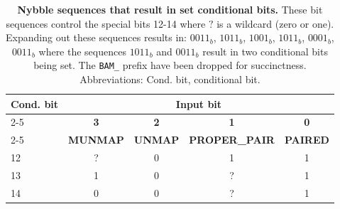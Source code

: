 \begin{table}[]
\centering
\caption{\textbf{Nybble sequences that result in set conditional bits.} These bit sequences control the special bits 12-14 where $?$ is a wildcard (zero or one). Expanding out these sequences results in: $0011_b$, $1011_b$, $1001_b$, $1011_b$, $0001_b$, $0011_b$ where the sequences $1011_b$ and $0011_b$ result in two conditional bits being set. The \texttt{BAM\_} prefix have been dropped for succinctness. Abbreviations: Cond. bit, conditional bit.}
\label{tab:optimize-rules}
\begin{tabular}{|l|c|c|c|c|}
\hline
\multirow{3}{*}{\textbf{Cond. bit}} & \multicolumn{4}{c|}{\textbf{Input bit}}                                    \\ \cline{2-5} 
                                    & \textbf{3}      & \textbf{2}     & \textbf{1}            & \textbf{0}      \\ \cline{2-5} 
                                    & \textbf{MUNMAP} & \textbf{UNMAP} & \textbf{PROPER\_PAIR} & \textbf{PAIRED} \\ \hline
12                                  & ?               & 0              & 1                     & 1               \\ \hline
13                                  & 1               & 0              & ?                     & 1               \\ \hline
14                                  & 0               & 0              & ?                     & 1               \\ \hline
\end{tabular}
\end{table}

